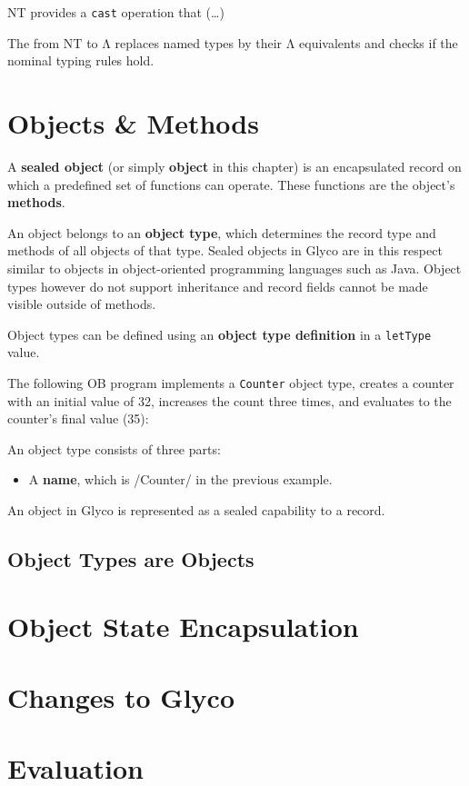 \documentclass[main.tex]{subfiles}
\begin{document}
NT provides a \texttt{cast} operation that (…)

The  from NT to Λ replaces named types by their Λ equivalents and checks if the nominal typing rules hold.

\section{Objects \& Methods} \label{sct:obj-meth}
A \textbf{sealed object} (or simply \textbf{object} in this chapter) is an encapsulated record on which a predefined set of functions can operate. These functions are the object's \textbf{methods}.

An object belongs to an \textbf{object type}, which determines the record type and methods of all objects of that type. Sealed objects in Glyco are in this respect similar to objects in object-oriented programming languages such as Java. Object types however do not support inheritance and record fields cannot be made visible outside of methods.

Object types can be defined using an \textbf{object type definition} in a \texttt{letType} value.

The following OB program implements a \texttt{Counter} object type, creates a counter with an initial value of 32, increases the count three times, and evaluates to the counter's final value (35):

An object type consists of three parts:
\begin{itemize}
    \item A \textbf{name}, which is \iil/Counter/ in the previous example.
\end{itemize}

An object in Glyco is represented as a sealed capability to a record.

\subsection{Object Types are Objects}

\section{Object State Encapsulation} \label{sct:obj-sec}

\section{Changes to Glyco} \label{sct:obj-changes}

\section{Evaluation} \label{sct:obj-eval}

\onlyinsubfile{\glsaddall\printglossaries}
\end{document}
